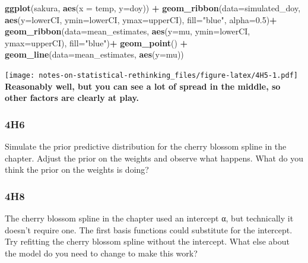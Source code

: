 \documentclass[
]{book}
\newenvironment{Shaded}{\begin{snugshade}}{\end{snugshade}}
\newcommand{\DataTypeTok}[1]{\textcolor[rgb]{0.13,0.29,0.53}{#1}}
\newcommand{\FloatTok}[1]{\textcolor[rgb]{0.00,0.00,0.81}{#1}}
\newcommand{\KeywordTok}[1]{\textcolor[rgb]{0.13,0.29,0.53}{\textbf{#1}}}
\newcommand{\NormalTok}[1]{#1}
\newcommand{\OperatorTok}[1]{\textcolor[rgb]{0.81,0.36,0.00}{\textbf{#1}}}
\newcommand{\StringTok}[1]{\textcolor[rgb]{0.31,0.60,0.02}{#1}}
\begin{document}
\begin{Shaded}
\begin{Highlighting}[]
\KeywordTok{ggplot}\NormalTok{(sakura, }\KeywordTok{aes}\NormalTok{(}\DataTypeTok{x =}\NormalTok{ temp, }\DataTypeTok{y=}\NormalTok{doy)) }\OperatorTok{+}\StringTok{ }
\StringTok{  }\KeywordTok{geom\_ribbon}\NormalTok{(}\DataTypeTok{data=}\NormalTok{simulated\_doy, }\KeywordTok{aes}\NormalTok{(}\DataTypeTok{y=}\NormalTok{lowerCI, }\DataTypeTok{ymin=}\NormalTok{lowerCI, }\DataTypeTok{ymax=}\NormalTok{upperCI), }\DataTypeTok{fill=}\StringTok{"blue"}\NormalTok{, }\DataTypeTok{alpha=}\FloatTok{0.5}\NormalTok{)}\OperatorTok{+}
\StringTok{  }\KeywordTok{geom\_ribbon}\NormalTok{(}\DataTypeTok{data=}\NormalTok{mean\_estimates, }\KeywordTok{aes}\NormalTok{(}\DataTypeTok{y=}\NormalTok{mu, }\DataTypeTok{ymin=}\NormalTok{lowerCI, }\DataTypeTok{ymax=}\NormalTok{upperCI), }\DataTypeTok{fill=}\StringTok{"blue"}\NormalTok{)}\OperatorTok{+}
\StringTok{  }\KeywordTok{geom\_point}\NormalTok{() }\OperatorTok{+}\StringTok{ }
\StringTok{  }\KeywordTok{geom\_line}\NormalTok{(}\DataTypeTok{data=}\NormalTok{mean\_estimates, }\KeywordTok{aes}\NormalTok{(}\DataTypeTok{y=}\NormalTok{mu))}
\end{Highlighting}
\end{Shaded}

\texttt{[image: notes-on-statistical-rethinking\_files/figure-latex/4H5-1.pdf]}
\textbf{Reasonably well, but you can see a lot of spread in the middle, so other factors are clearly at play.}

\hypertarget{h6}{%
\subsubsection*{4H6}\label{h6}}

Simulate the prior predictive distribution for the cherry blossom spline in the chapter. Adjust the prior on the weights and observe what happens. What do you think the prior on the weights is doing?

\hypertarget{h8}{%
\subsubsection*{4H8}\label{h8}}

The cherry blossom spline in the chapter used an intercept α, but technically it doesn't require one. The first basis functions could substitute for the intercept. Try refitting the cherry blossom spline without the intercept. What else about the model do you need to change to make this work?

  
\end{document}
